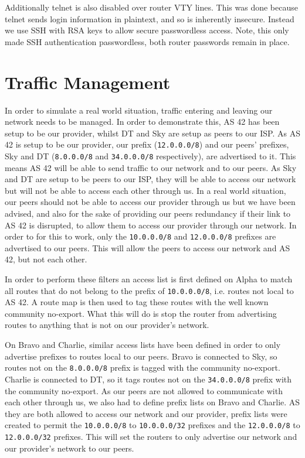 Additionally telnet is also disabled over router VTY lines. This was done
because telnet sends login information in plaintext, and so is inherently
insecure. Instead we use SSH with RSA keys to allow secure passwordless access.
Note, this only made SSH authentication passwordless, both router passwords
remain in place.

\section{Traffic Management}
In order to simulate a real world situation, traffic entering and leaving our
network needs to be managed. In order to demonstrate this, AS 42 has been setup
to be our provider, whilst DT and Sky are setup as peers to our ISP. As AS 42 is
setup to be our provider, our prefix (\texttt{12.0.0.0/8}) and our peers'
prefixes, Sky and DT (\texttt{8.0.0.0/8} and \texttt{34.0.0.0/8} respectively),
are advertised to it. This means AS 42 will be able to send traffic to our
network and to our peers. As Sky and DT are setup to be peers to our ISP, they
will be able to access our network but will not be able to access each other
through us. In a real world situation, our peers should not be able to access
our provider through us but we have been advised, and also for the sake of
providing our peers redundancy if their link to AS 42 is disrupted, to allow
them to access our provider through our network. In order to for this to work,
only the \texttt{10.0.0.0/8} and \texttt{12.0.0.0/8} prefixes are advertised to
our peers. This will allow the peers to access our network and AS 42, but not
each other.

In order to perform these filters an access list is first defined on Alpha to
match all routes that do not belong to the prefix of \texttt{10.0.0.0/8}, i.e.
routes not local to AS 42. A route map is then used to tag these routes with the
well known community no-export. What this will do is stop the router from
advertising routes to anything that is not on our provider's network.

On Bravo and Charlie, similar access lists have been defined in order to only
advertise prefixes to routes local to our peers. Bravo is connected to Sky, so
routes not on the \texttt{8.0.0.0/8} prefix is tagged with the community
no-export. Charlie is connected to DT, so it tags routes not on the
\texttt{34.0.0.0/8} prefix with the community no-export. As our peers are not
allowed to communicate with each other through us, we also had to define prefix
lists on Bravo and Charlie. AS they are both allowed to access our network and
our provider, prefix lists were created to permit the \texttt{10.0.0.0/8} to
\texttt{10.0.0.0/32} prefixes and the \texttt{12.0.0.0/8} to
\texttt{12.0.0.0/32} prefixes. This will set the routers to only advertise our
network and our provider's network to our peers.


